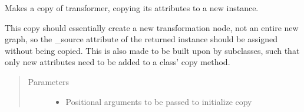 \documentclass[letterpaper,10pt,english]{sphinxmanual}
\begin{document}
\begin{fulllineitems}
\begin{sphinxVerbatim}[commandchars=\\\{\}]
       
  \PYG{p}{[}\PYG{p}{[}\PYG{p}{]}\PYG{p}{]} \PYG{p}{[}   \PYG{p}{]}
   
\end{sphinxVerbatim}

\begin{fulllineitems}
\label{\detokenize{dalio.pipe:dalio.pipe.select.ColReorder.copy}}
Makes a copy of transformer, copying its attributes to a new
instance.

This copy should essentially create a new transformation node, not an
entire new graph, so the \_source attribute of the returned instance
should be assigned without being copied. This is also made to be built
upon by subclasses, such that only new attributes need to be added to
a class’ copy method.
\begin{quote}\begin{description}
\item[{Parameters}] \leavevmode\begin{itemize}
\item {} 
 \textendash{} Positional arguments to be passed to initialize copy


\end{itemize}
\end{description}
\end{quote}
\end{fulllineitems}
\end{fulllineitems}
\end{document}
